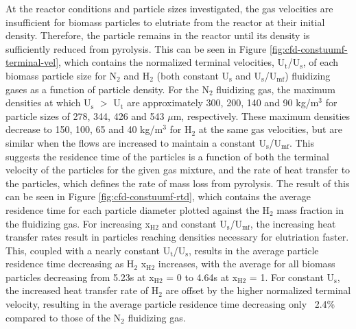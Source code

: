 At the reactor conditions and particle sizes investigated, the gas velocities are insufficient for biomass particles to elutriate from the reactor at their initial density. Therefore, the particle remains in the reactor until its density is sufficiently reduced from pyrolysis. This can be seen in Figure \ref{fig:cfd-constuumf-terminal-vel}, which contains the normalized terminal velocities, U$_\text{t}$/U$_\text{s}$, of each biomass particle size for N$_2$ and H$_2$ (both constant U$_\text{s}$ and U$_\text{s}$/U$_\text{mf}$) fluidizing gases as a function of particle density. For the N$_2$ fluidizing gas, the maximum densities at which U$_\text{s}$ $>$ U$_\text{t}$ are approximately 300, 200, 140 and 90 kg/m$^3$ for particle sizes of 278, 344, 426 and 543 $\mu$m, respectively. These maximum densities decrease to 150, 100, 65 and 40 kg/m$^3$ for H$_2$ at the same gas velocities, but are similar when the flows are increased to maintain a constant U$_\text{s}$/U$_\text{mf}$. This suggests the residence time of the particles is a function of both the terminal velocity of the particles for the given gas mixture, and the rate of heat transfer to the particles, which defines the rate of mass loss from pyrolysis. The result of this can be seen in Figure \ref{fig:cfd-constuumf-rtd}, which contains the average residence time for each particle diameter plotted against the H$_2$ mass fraction in the fluidizing gas. For increasing x$_\text{H2}$ and constant U$_\text{s}$/U$_\text{mf}$, the increasing heat transfer rates result in particles reaching densities necessary for elutriation faster. This, coupled with a nearly constant U$_\text{t}$/U$_\text{s}$, results in the average particle residence time decreasing as H$_2$ x$_\text{H2}$ increases, with the average for all biomass particles decreasing from 5.23s at x$_\text{H2}$ = 0 to 4.64s at x$_\text{H2}$ = 1. For constant U$_\text{s}$, the increased heat transfer rate of H$_2$ are offset by the higher normalized terminal velocity, resulting in the average particle residence time decreasing only ~2.4\% compared to those of the N$_2$ fluidizing gas.

